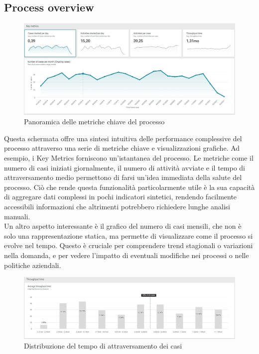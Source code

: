 \documentclass{article}
\begin{document}
\subsection{Process overview}
\begin{figure}[H]
    \centering
    \includegraphics[width=\textwidth]{imgARIS/Simulazione/ProcessOverview1Simulazione.png}
    \caption{Panoramica delle metriche chiave del processo}
    \label{fig:process-overview-1}
\end{figure}
Questa schermata offre una sintesi intuitiva delle performance complessive del processo attraverso una serie di metriche chiave e visualizzazioni grafiche. Ad esempio, i Key Metrics forniscono un’istantanea del processo. Le metriche come il numero di casi iniziati giornalmente, il numero di attività avviate e il tempo di attraversamento medio permettono di farsi un'idea immediata della salute del processo. Ciò che rende questa funzionalità particolarmente utile è la sua capacità di aggregare dati complessi in pochi indicatori sintetici, rendendo facilmente accessibili informazioni che altrimenti potrebbero richiedere lunghe analisi manuali.\\
Un altro aspetto interessante è il grafico del numero di casi mensili, che non è solo una rappresentazione statica, ma permette di visualizzare come il processo si evolve nel tempo. Questo è cruciale per comprendere trend stagionali o variazioni nella domanda, e per vedere l’impatto di eventuali modifiche nei processi o nelle politiche aziendali.\\
\begin{figure}[H]
    \centering
    \includegraphics[width=\textwidth]{imgARIS/Simulazione/ProcessOverview2Simulazione.png}
    \caption{Distribuzione del tempo di attraversamento dei casi}
    \label{fig:process-overview-2}
\end{figure}
\end{document}
